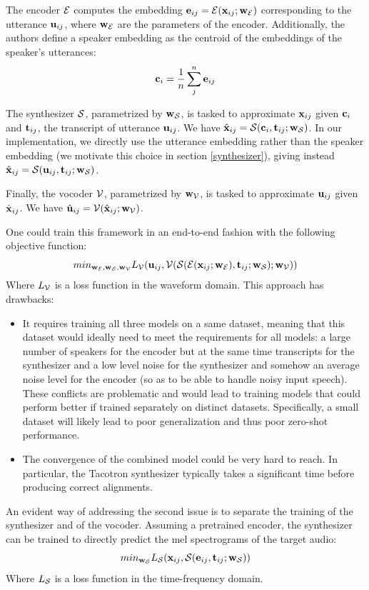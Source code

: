 \documentclass[a4paper, oneside, 12pt, english]{article}
\begin{document}
The encoder $\mathcal{E}$ computes the embedding $\mathbf{e}_{ij} = \mathcal{E}(\mathbf{x}_{ij}; \mathbf{w}_{\mathcal{E}})$ corresponding to the utterance $\mathbf{u}_{ij}$, where $\mathbf{w}_{\mathcal{E}}$ are the parameters of the encoder. Additionally, the authors define a speaker embedding as the centroid of the embeddings of the speaker's utterances:
\begin{equation}\label{speaker_embedding}
\mathbf{c}_i=\frac{1}{n}\sum_{j}^{n}\mathbf{e}_{ij}
\end{equation}

The synthesizer $\mathcal{S}$, parametrized by $\mathbf{w}_{\mathcal{S}}$, is tasked to approximate $\mathbf{x}_{ij}$ given $\mathbf{c}_i$ and $\mathbf{t}_{ij}$, the transcript of utterance $\mathbf{u}_{ij}$. We have $\hat{\mathbf{x}}_{ij} = \mathcal{S}(\mathbf{c}_i, \mathbf{t}_{ij}; \mathbf{w}_{\mathcal{S}})$. In our implementation, we directly use the utterance embedding rather than the speaker embedding (we motivate this choice in section \ref{synthesizer}), giving instead $\hat{\mathbf{x}}_{ij} = \mathcal{S}(\mathbf{u}_{ij}, \mathbf{t}_{ij}; \mathbf{w}_{\mathcal{S}})$.

Finally, the vocoder $\mathcal{V}$, parametrized by $\mathbf{w}_{\mathcal{V}}$, is tasked to approximate $\mathbf{u}_{ij}$ given $\hat{\mathbf{x}}_{ij}$. We have $\hat{\mathbf{u}}_{ij} = \mathcal{V}(\hat{\mathbf{x}}_{ij}; \mathbf{w}_{\mathcal{V}})$.

One could train this framework in an end-to-end fashion with the following objective function:
$$ min_{\mathbf{w}_{\mathcal{E}}, \mathbf{w}_{\mathcal{S}}, \mathbf{w}_{\mathcal{V}}} L_{\mathcal{V}}(\mathbf{u}_{ij}, \mathcal{V}(\mathcal{S}(\mathcal{E}(\mathbf{x}_{ij}; \mathbf{w}_{\mathcal{E}}), \mathbf{t}_{ij}; \mathbf{w}_{\mathcal{S}}); \mathbf{w}_{\mathcal{V}})) $$
Where $L_{\mathcal{V}}$ is a loss function in the waveform domain. This approach has drawbacks:
\begin{itemize}
	\item It requires training all three models on a same dataset, meaning that this dataset would ideally need to meet the requirements for all models: a large number of speakers for the encoder but at the same time transcripts for the synthesizer and a low level noise for the synthesizer and somehow an average noise level for the encoder (so as to be able to handle noisy input speech). These conflicts are problematic and would lead to training models that could perform better if trained separately on distinct datasets. Specifically, a small dataset will likely lead to poor generalization and thus poor zero-shot performance.
	\item The convergence of the combined model could be very hard to reach. In particular, the Tacotron synthesizer typically takes a significant time before producing correct alignments.
\end{itemize}

An evident way of addressing the second issue is to separate the training of the synthesizer and of the vocoder. Assuming a pretrained encoder, the synthesizer can be trained to directly predict the mel spectrograms of the target audio:
$$ min_{\mathbf{w}_{\mathcal{S}}} L_{\mathcal{S}}(\mathbf{x}_{ij}, \mathcal{S}(\mathbf{e}_{ij}, \mathbf{t}_{ij}; \mathbf{w}_{\mathcal{S}})) $$
Where $L_{\mathcal{S}}$ is a loss function in the time-frequency domain. 
\end{document}
